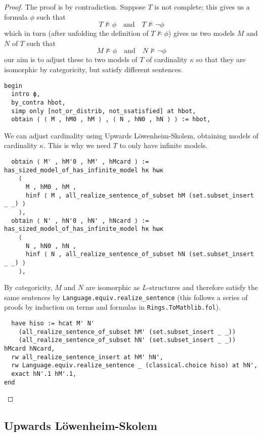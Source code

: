 \begin{proof}
The proof is by contradiction.
Suppose $T$ is not complete;
this gives us a formula $\phi$ such that
\[ T \nvDash \phi \quad \text{and} \quad T \nvDash \neg \phi \]
which in turn (after unfolding the definition of $T \nvDash \phi$)
gives us two models $M$ and $N$ of $T$ such that
\[ M \nvDash \phi \quad \text{and} \quad N \nvDash \neg \phi \]
our aim is to adjust these to two models of $T$
of cardinality $\kappa$ so that they are isomorphic by categoricity,
but satisfy different sentences.

\begin{lstlisting}
begin
  intro ϕ,
  by_contra hbot,
  simp only [not_or_distrib, not_ssatisfied] at hbot,
  obtain ⟨ ⟨ M , hM0 , hM ⟩ , ⟨ N , hN0 , hN ⟩ ⟩ := hbot,
\end{lstlisting}

We can adjust cardinality using Upwards L\"{o}wenheim-Skolem,
obtaining models of cardinality $\kappa$.
This is why we need $T$ to only have infinite models.
\begin{lstlisting}
  obtain ⟨ M' , hM'0 , hM' , hMcard ⟩ := has_sized_model_of_has_infinite_model hκ hωκ
    ⟨
      M , hM0 , hM ,
      hinf ⟨ M , all_realize_sentence_of_subset hM (set.subset_insert _ _) ⟩
    ⟩,
  obtain ⟨ N' , hN'0 , hN' , hNcard ⟩ := has_sized_model_of_has_infinite_model hκ hωκ
    ⟨
      N , hN0 , hN ,
      hinf ⟨ N , all_realize_sentence_of_subset hN (set.subset_insert _ _) ⟩
    ⟩, \end{lstlisting}

By categoricity, $M$ and $N$ are isomorphic as $L$-structures
and therefore satisfy the same sentences by
\texttt{Language.equiv.realize_sentence}
(this follows a series of proofs by induction on terms and formulas in
\texttt{Rings.ToMathlib.fol}).

\begin{lstlisting}
  have hiso := hcat M' N'
    (all_realize_sentence_of_subset hM' (set.subset_insert _ _))
    (all_realize_sentence_of_subset hN' (set.subset_insert _ _)) hMcard hNcard,
  rw all_realize_sentence_insert at hM' hN',
  rw Language.equiv.realize_sentence _ (classical.choice hiso) at hN',
  exact hN'.1 hM'.1,
end
\end{lstlisting}
\end{proof}

\subsection{Upwards L\"{o}wenheim-Skolem}

